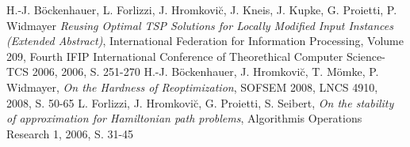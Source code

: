 \documentclass[a4paper,11pt]{scrreprt}
\begin{document}
\begin{thebibliography}{9}

  H.-J. Böckenhauer, L. Forlizzi, J. Hromkovi\u{c}, J. Kneis, J. Kupke, G. Proietti, P. Widmayer 
  \emph{Reusing Optimal TSP Solutions for Locally Modified Input Instances (Extended Abstract)},
  International Federation for Information Processing, Volume 209, Fourth IFIP International Conference of Theorethical Computer Science-TCS 2006, 2006, S. 251-270
  H.-J. Böckenhauer, J. Hromkovi\u{c}, T. Mömke, P. Widmayer,
  \emph{On the Hardness of Reoptimization},
  SOFSEM 2008, LNCS 4910, 2008, S. 50-65
  L. Forlizzi, J. Hromkovi\u{c}, G. Proietti, S. Seibert,
  \emph{On the stability of approximation for Hamiltonian path problems},
  Algorithmis Operations Research 1, 2006, S. 31-45

\end{thebibliography}
  
\end{document}
